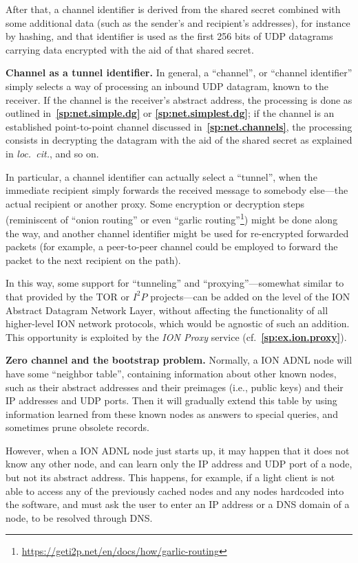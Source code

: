 \documentclass[12pt,oneside]{article}
\def\makepoint#1{\medbreak\noindent{\bf #1.\ }}
\def\nxsubpoint{\refstepcounter{subsubsection}%
  \smallbreak\makepoint{\thesubsubsection}}
\def\refpoint#1{{\rm\textbf{\ref{#1}}}}
\let\ptref=\refpoint
\def\embt(#1.){\textbf{#1.}}
\begin{document}
After that, a channel identifier is derived from the shared secret
combined with some additional data (such as the sender's and
recipient's addresses), for instance by hashing, and that identifier
is used as the first 256 bits of UDP datagrams carrying data encrypted
with the aid of that shared secret.

\nxsubpoint\label{sp:tunnels} \embt(Channel as a tunnel identifier.)
In general, a ``channel'', or ``channel identifier'' simply selects a
way of processing an inbound UDP datagram, known to the receiver. If
the channel is the receiver's abstract address, the processing is done
as outlined in~\ptref{sp:net.simple.dg} or \ptref{sp:net.simplest.dg};
if the channel is an established point-to-point channel discussed
in~\ptref{sp:net.channels}, the processing consists in decrypting the
datagram with the aid of the shared secret as explained in {\em
  loc.~cit.}, and so on.

In particular, a channel identifier can actually select a ``tunnel'',
when the immediate recipient simply forwards the received message to
somebody else---the actual recipient or another proxy. Some encryption
or decryption steps (reminiscent of ``onion routing'' \cite{Onion} or
even ``garlic
routing''\footnote{\url{https://geti2p.net/en/docs/how/garlic-routing}})
might be done along the way, and another channel identifier might be
used for re-encrypted forwarded packets (for example, a peer-to-peer
channel could be employed to forward the packet to the next recipient
on the path).

In this way, some support for ``tunneling'' and
``proxying''---somewhat similar to that provided by the TOR or $I^2P$
projects---can be added on the level of the ION Abstract Datagram
Network Layer, without affecting the functionality of all higher-level
ION network protocols, which would be agnostic of such an
addition. This opportunity is exploited by the {\em ION Proxy\/}
service (cf.~\ptref{sp:ex.ion.proxy}).

\nxsubpoint\label{sp:net.startup} \embt(Zero channel and the bootstrap
problem.)  Normally, a ION ADNL node will have some ``neighbor
table'', containing information about other known nodes, such as their
abstract addresses and their preimages (i.e., public keys) and their
IP addresses and UDP ports. Then it will gradually extend this table
by using information learned from these known nodes as answers to
special queries, and sometimes prune obsolete records.

However, when a ION ADNL node just starts up, it may happen that it
does not know any other node, and can learn only the IP address and
UDP port of a node, but not its abstract address. This happens, for
example, if a light client is not able to access any of the previously
cached nodes and any nodes hardcoded into the software, and must ask
the user to enter an IP address or a DNS domain of a node, to be
resolved through DNS.
\end{document}
